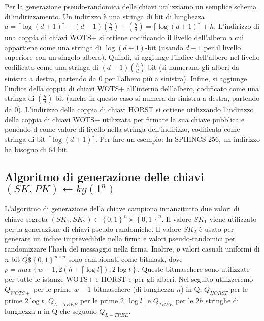 Per la generazione pseudo-randomica delle chiavi utilizziamo un semplice schema di indirizzamento. Un indirizzo è una stringa di bit di lunghezza \(a = \lceil \log(d + 1)\rceil + (d - 1)(\frac{h}{d}) + (\frac{h}{d}) = \lceil \log(d + 1)\rceil + h\). L'indirizzo di una coppia di chiavi WOTS+ si ottiene codificando il livello dell'albero a cui appartiene come una stringa di \(\log(d+1)\)-bit (usando \(d-1\) per il livello superiore con un singolo albero). Quindi, si aggiunge l'indice dell'albero nel livello codificato come una stringa di \((d - 1)(\frac{h}{d})\)-bit (si numerano gli alberi da sinistra a destra, partendo da 0 per l'albero più a sinistra). Infine, si aggiunge l'indice della coppia di chiavi WOTS+ all'interno dell'albero, codificato come una stringa di \((\frac{h}{d})\)-bit (anche in questo caso si numera da sinistra a destra, partendo da 0). L'indirizzo della coppia di chiavi HORST si ottiene utilizzando l'indirizzo della coppia di chiavi WOTS+ utilizzata per firmare la sua chiave pubblica e ponendo d come valore di livello nella stringa dell'indirizzo, codificata come stringa di bit \(\lceil \log(d + 1) \rceil\). Per fare un esempio: In SPHINCS-256, un indirizzo ha bisogno di 64 bit.

\subsection{Algoritmo di generazione delle chiavi\\\((SK, PK) \leftarrow kg(1^n)\)}
L'algoritmo di generazione della chiave campiona innanzitutto due valori di chiave segreta \( (SK_1, SK_2) \in \left\{0,1\right\}^n \times \left\{0,1\right\}^n \). Il valore \(SK_1\) viene utilizzato per la generazione di chiavi pseudo-randomiche. Il valore \(SK_2\) è usato per generare un indice imprevedibile nella firma e valori pseudo-randomici per randomizzare l'hash del messaggio nella firma. Inoltre, \(p\) valori casuali uniformi di \(n\)-bit \(Q \underleftarrow{\$} \left\{0, 1\right\}^{p \times n}\) sono campionati come bitmask, dove \( p = max\left\{w-1, 2(h + \lceil \log l \rceil), 2 \log t\right\} \). Queste bitmaschere sono utilizzate per tutte le istanze WOTS+ e HORST e per gli alberi. Nel seguito utilizzeremo \(Q_{WOTS+}\) per le prime \(w - 1\) bitmaschere (di lunghezza \(n\)) in Q, \(Q_{HORST}\) per le prime \(2 \log t\), \(Q_{L-TREE}\) per le prime \( 2 \lceil \log l \rceil \) e \(Q_{TREE}\) per le \(2h\) stringhe di lunghezza n in Q che seguono \(Q_{L-TREE}\).


